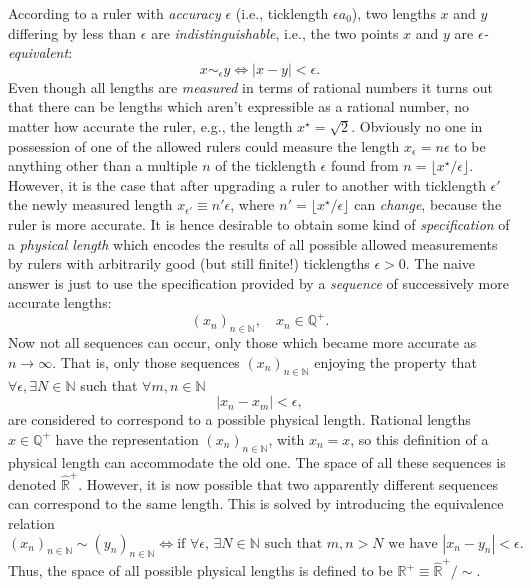 \documentclass[11pt]{amsart}
\theoremstyle{plain}%
\theoremstyle{definition}
\theoremstyle{remark}
\begin{document}
According to a ruler with \emph{accuracy} $\epsilon$ (i.e., ticklength $\epsilon a_0$), two lengths $x$ and $y$ differing by less than $\epsilon$ are \emph{indistinguishable}, i.e., the two points $x$ and $y$ are \emph{$\epsilon$-equivalent}:
\begin{equation}
	x\sim_\epsilon y \Leftrightarrow |x-y| < \epsilon. 
\end{equation} 
Even though all lengths are \emph{measured} in terms of rational numbers it turns out that there can be lengths which aren't expressible as a rational number, no matter how accurate the ruler, e.g., the length $x^\star = \sqrt{2}$. Obviously no one in possession of one of the allowed rulers could measure the length $x_{\epsilon} = n\epsilon$ to be anything other than a multiple $n$ of the ticklength $\epsilon$ found from $n = \lfloor x^\star/\epsilon \rfloor$. However, it is the case that after upgrading a ruler to another with ticklength $\epsilon'$ the newly measured length $x_{\epsilon'} \equiv n'\epsilon$, where $n' = \lfloor x^\star/\epsilon \rfloor$ can \emph{change}, because the ruler is more accurate. It is hence desirable to obtain some kind of \emph{specification} of a \emph{physical length} which encodes the results of all possible allowed measurements by rulers with arbitrarily good (but still finite!) ticklengths $\epsilon > 0$. The naive answer is just to use the specification provided by a \emph{sequence} of successively more accurate lengths:
\begin{equation}
	(x_n)_{n \in \mathbb{N}}, \quad x_n\in \mathbb{Q}^+.
\end{equation}
Now not all sequences can occur, only those which became more accurate as $n \rightarrow \infty$. That is, only those sequences $(x_n)_{n \in \mathbb{N}}$ enjoying the property that $\forall \epsilon, \exists N\in \mathbb{N}$ such that $\forall m,n\in \mathbb{N}$
\begin{equation}
	|x_n-x_m| < \epsilon,
\end{equation} 
are considered to correspond to a possible physical length. Rational lengths $x\in \mathbb{Q}^+$ have the representation $(x_n)_{n\in \mathbb{N}}$, with $x_n = x$, so this definition of a physical length can accommodate the old one. The space of all these sequences is denoted $\widehat{\mathbb{R}}^+$. However, it is now possible that two apparently different sequences can correspond to the same length. This is solved by introducing the equivalence relation 
\begin{equation}
	(x_n)_{n \in \mathbb{N}} \sim (y_n)_{n \in \mathbb{N}} \Leftrightarrow \text{if $\forall \epsilon$, $\exists N\in \mathbb{N}$ such that $m,n>N$ we have $|x_n-y_n| < \epsilon$.} 
\end{equation}
Thus, the space of all possible physical lengths is defined to be $\mathbb{R}^+ \equiv \widehat{\mathbb{R}}^+/\sim$.
\end{document}
